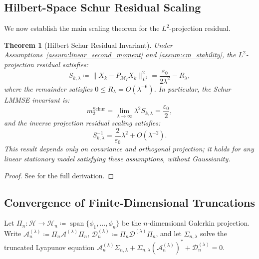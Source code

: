 \documentclass[11pt]{amsart}
\theoremstyle{plain}
\newtheorem{theorem}{Theorem}
\theoremstyle{definition}
\theoremstyle{remark}
\begin{document}
\subsection{Hilbert-Space Schur Residual Scaling}
\label{sec:infdim:scaling}

We now establish the main scaling theorem for the $L^2$-projection residual.

\begin{theorem}[Hilbert Schur Residual Invariant]
  \label{thm:inf_cancellation}
  Under Assumptions~\ref{assum:linear_second_moment} and \ref{assum:cm_stability}, the $L^2$-projection residual satisfies:
  \begin{equation}
    \label{eq:main_schur_sharp}
    S_{k,\lambda} \coloneqq \|X_k - P_{\mathcal{M}_I} X_k\|_{L^2}^2 = \frac{\varepsilon_0}{2\lambda^2} - R_\lambda,
  \end{equation}
  where the remainder satisfies $0 \le R_\lambda = O(\lambda^{-6})$. In particular, the Schur LMMSE invariant is:
  \begin{equation}
    \label{eq:m2_schur_value}
    m_2^{\mathrm{Schur}} = \lim_{\lambda\to\infty} \lambda^2 S_{k,\lambda} = \frac{\varepsilon_0}{2},
  \end{equation}
  and the inverse projection residual scaling satisfies:
  \begin{equation}
    \label{eq:schur_scaling_inverse}
    S_{k,\lambda}^{-1} = \frac{2}{\varepsilon_0}\lambda^2 + O(\lambda^{-2}).
  \end{equation}
  This result depends only on covariance and orthogonal projection; it holds for any linear stationary model satisfying these assumptions, without Gaussianity.
\end{theorem}
\begin{proof}
  See  for the full derivation.
\end{proof}

\subsection{Convergence of Finite-Dimensional Truncations}
\label{sec:proofs:convergence}

Let $\Pi_n: \mathcal{H} \to \mathcal{H}_n \coloneqq \operatorname{span}\{\phi_1, \ldots, \phi_n\}$ be the $n$-dimensional Galerkin projection. Write $\mathcal{A}_n^{(\lambda)} \coloneqq \Pi_n \mathcal{A}^{(\lambda)} \Pi_n$, $\mathcal{D}_n^{(\lambda)} \coloneqq \Pi_n \mathcal{D}^{(\lambda)} \Pi_n$, and let $\Sigma_{n,\lambda}$ solve the truncated Lyapunov equation $\mathcal{A}_n^{(\lambda)} \Sigma_{n,\lambda} + \Sigma_{n,\lambda} (\mathcal{A}_n^{(\lambda)})^* + \mathcal{D}_n^{(\lambda)} = 0$.
\end{document}
